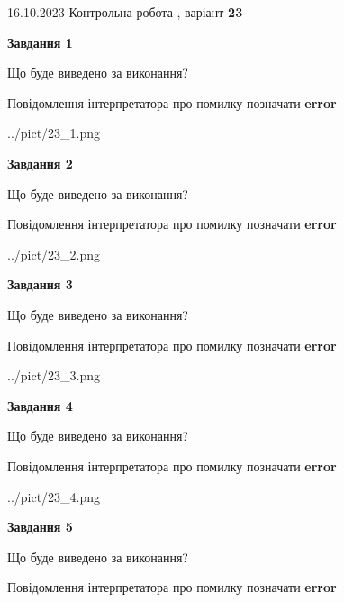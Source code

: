 \documentclass[12pt, ukrainian]{article}
\begin{document}
{\Large{16.10.2023 Контрольна робота , варіант  \No \textbf { 23 }\par}}
{
\begin {large}
{\begin {center}\textbf{Завдання 1}\end {center}}\par
Що буде виведено за виконання? \par
Повідомлення інтерпретатора про помилку позначати \textbf{error}

\begin{center}
	{../pict/23_1.png}
\end{center}
\newpage

{\begin {center}\textbf{Завдання 2}\end {center}}\par
Що буде виведено за виконання? \par
Повідомлення інтерпретатора про помилку позначати \textbf{error}

\begin{center}
	{../pict/23_2.png}
\end{center}
\newpage

{\begin {center}\textbf{Завдання 3}\end {center}}\par
Що буде виведено за виконання? \par
Повідомлення інтерпретатора про помилку позначати \textbf{error}

\begin{center}
	{../pict/23_3.png}
\end{center}
\newpage

{\begin {center}\textbf{Завдання 4}\end {center}}\par
Що буде виведено за виконання? \par
Повідомлення інтерпретатора про помилку позначати \textbf{error}

\begin{center}
	{../pict/23_4.png}
\end{center}
\newpage

{\begin {center}\textbf{Завдання 5}\end {center}}\par
Що буде виведено за виконання? \par
Повідомлення інтерпретатора про помилку позначати \textbf{error}


\end{large}}
\end{document}
